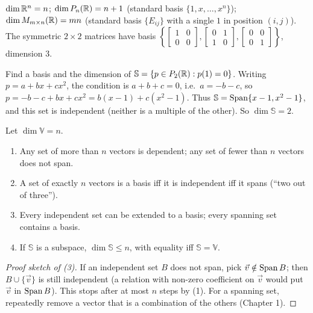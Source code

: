\begin{example}
$\dim\mathbb{R}^n=n$; $\dim P_{n}(\mathbb{R})=n+1$ (standard basis $\{1,x,\dots,x^n\}$); $\dim M_{m\times n}(\mathbb{R})=mn$ (standard basis
$\{E_{ij}\}$ with a single $1$ in position $(i,j)$). The symmetric $2\times2$ matrices have basis
$\left\{\begin{bmatrix}1&0\\0&0\end{bmatrix},\begin{bmatrix}0&1\\1&0\end{bmatrix},\begin{bmatrix}0&0\\0&1\end{bmatrix}\right\}$, dimension $3$.
\end{example}

\begin{example}
Find a basis and the dimension of $\mathbb S=\{p\in P_{2}(\mathbb{R}):p(1)=0\}$. Writing $p=a+bx+cx^2$, the condition is
$a+b+c=0$, i.e.\ $a=-b-c$, so
$p=-b-c+bx+cx^2=b(x-1)+c(x^2-1)$. Thus $\mathbb S=\operatorname{Span}\{x-1,x^2-1\}$, and this set is independent (neither is a
multiple of the other). So $\dim\mathbb S=2$.
\end{example}

\begin{theorem}
Let $\dim\mathbb V=n$.
\begin{enumerate}
  \item Any set of more than $n$ vectors is dependent; any set of fewer than $n$ vectors does not span.
  \item A set of exactly $n$ vectors is a basis iff it is independent iff it spans (``two out of three'').
  \item Every independent set can be extended to a basis; every spanning set contains a basis.
  \item If $\mathbb S$ is a subspace, $\dim\mathbb S\le n$, with equality iff $\mathbb S=\mathbb V$.
\end{enumerate}
\end{theorem}
\begin{proof}[Proof sketch of (3)]
If an independent set $B$ does not span, pick $\vec v\notin\operatorname{Span} B$; then $B\cup\{\vec v\}$ is still independent
(a relation with non-zero coefficient on $\vec v$ would put $\vec v$ in $\operatorname{Span} B$). This stops after at most $n$ steps by
(1). For a spanning set, repeatedly remove a vector that is a combination of the others (Chapter 1).
\end{proof}

